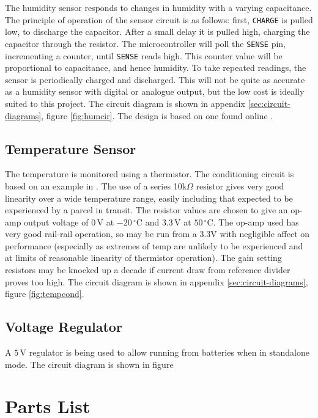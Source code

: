 \documentclass[a4paper,11pt]{article}  %
\providecommand{\degrees}{\ensuremath{^{\circ}}}
\begin{document}
The humidity sensor responds to changes in humidity with a varying
capacitance. The principle of operation of the sensor circuit is as
follows: first, \texttt{CHARGE} is pulled low, to discharge the
capacitor. After a small delay it is pulled high, charging the
capacitor through the resistor. The microcontroller will poll the
\texttt{SENSE} pin, incrementing a counter, until \texttt{SENSE} reads
high. This counter value will be proportional to capacitance, and
hence humidity. To take repeated readings, the sensor is periodically
charged and discharged. This will not be quite as accurate as a
humidity sensor with digital or analogue output, but the low cost is
ideally suited to this project. The circuit diagram is shown in
appendix \ref{sec:circuit-diagrams}, figure \ref{fig:humcir}. The
design is based on one found online \cite{hum_sens}.

\subsection{Temperature Sensor}

The temperature is monitored using a thermistor. The conditioning
circuit is based on an example in \cite{HH}. The use of a series
10k$\Omega$ resistor gives very good linearity over a wide temperature
range, easily including that expected to be experienced by a parcel in
transit. The resistor values are chosen to give an op-amp output
voltage of $0\,\mathrm{V}$ at $-20\,\mathrm{\degrees C}$ and
$3.3\,\mathrm{V}$ at $50\,\mathrm{\degrees C}$. The op-amp used has
very good rail-rail operation, so may be run from a 3.3V with
negligible affect on performance (especially as extremes of temp are
unlikely to be experienced and at limits of reasonable linearity of
thermistor operation). The gain setting resistors may be knocked up a
decade if current draw from reference divider proves too high. The
circuit diagram is shown in appendix \ref{sec:circuit-diagrams},
figure \ref{fig:tempcond}.

\subsection{Voltage Regulator}

A $5\,\mathrm{V}$ regulator is being used to allow running from
batteries when in standalone mode. The circuit diagram is shown in
figure 

\section{Parts List}
\label{sec:parts-list}
\end{document}
